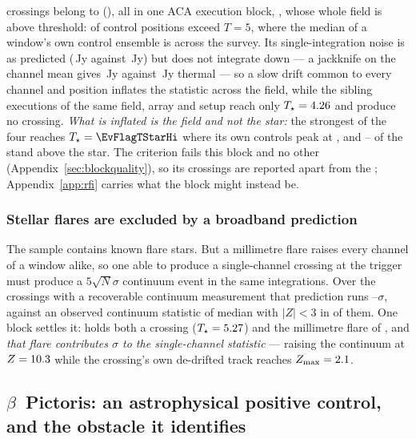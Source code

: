 \BdNCross{} crossings belong to \BdStar{} (\BdAlias), all in one ACA execution
block, \texttt{\BdBlock}, whose whole field is above threshold:
\BdNCtrlAbove{} of \BdNCtrl{} control positions exceed $T=5$, where the median
of a window's own control ensemble is \BdSurvCtrlMed{} across the survey. Its single-integration noise is as
predicted (\BdRmsMeas\,Jy against \BdRmsPred\,Jy) but does not integrate down
--- a jackknife on the channel mean gives \BdJack\,Jy against
\BdThermal\,Jy thermal --- so a slow drift common to every channel and
position inflates the statistic across the field, while the \BdNSibling{}
sibling executions of the same field, array and setup reach only
$T_\star=4.26{}$ and produce no crossing. \emph{What is inflated is the
field and not the star:} the strongest of the four reaches
$T_\star=\EvFlagTStarHi$ where its own controls peak at \EvFlagCtrlAtHi, and
\EvFlagNgeLo--\EvFlagNgeHi{} of the \BdNCtrl{} stand above the star. The
criterion fails this block and no other
(Appendix~\ref{sec:blockquality}), so its \BdNCross{} crossings are reported
apart from the \EvNCrossQp{}; Appendix~\ref{app:rfi} carries what the block
might instead be.

\subsubsection{Stellar flares are excluded by a broadband prediction}

The sample contains known flare stars. But a millimetre flare raises every
channel of a window alike, so one able to produce a single-channel crossing at
the trigger must produce a $5\sqrt{N}\sigma$ continuum event in the same
integrations. Over the \FlNCont{} crossings with a recoverable continuum
measurement that prediction runs \FlPredLo--\FlPredHi$\sigma$, against an
observed continuum statistic of median \FlObsMed{} with $|Z|<3$ in \FlNQuiet{}
of them. One block settles it: \FlEgStar{} \texttt{\FlEgEb} holds both a
crossing ($T_\star=5.27$) and the millimetre flare of
\citet{MacGregor2020}, and \emph{that flare contributes \FlEgContrib$\sigma$
to the single-channel statistic} --- raising the continuum at $Z=10.3$
while the crossing's own de-drifted track reaches $Z_{\max}=2.1$.

\subsection{$\beta$~Pictoris: an astrophysical positive control, and the
obstacle it identifies} \label{sec:bpicval}

